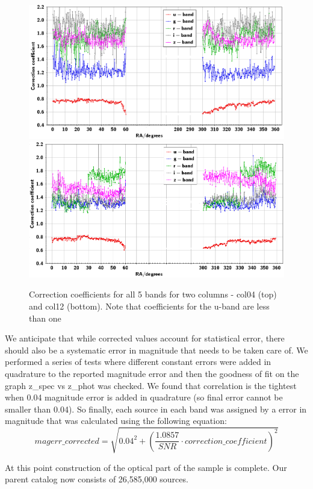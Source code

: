 \begin{figure}[!ht]
\includegraphics[width=6in]{Figures/magerr_corr_04.png}
\includegraphics[width=6in]{Figures/magerr_corr_12.png}
\caption{Correction coefficients for all 5 bands for two columns - col04 (top) and col12 (bottom). Note that coefficients for the u-band are less than one}
\label{fig:err_corr_coef}
\end{figure}

We anticipate that while corrected values account for statistical error, there should also be a systematic error in magnitude that needs to be taken care of. We performed a series of tests where different constant errors were added in quadrature to the reported magnitude error and then the goodness of fit on the graph z\_spec vs z\_phot was checked. We found that correlation is the tightest when 0.04 magnitude error is added in quadrature (so final error cannot be smaller than 0.04). So finally, each source in each band was assigned by a error in magnitude that was calculated using the following equation: 
$$ magerr\_corrected = \sqrt{0.04^{2}+(\dfrac{1.0857}{SNR}\cdot correction\_coefficient)^{2}}$$

At this point construction of the optical part of the sample is complete. Our parent catalog now consists of 26,585,000 sources. 

